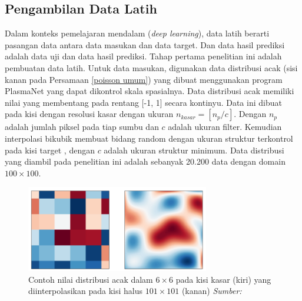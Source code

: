 \subsection{Pengambilan Data Latih}
\label{data_latih} Dalam konteks pemelajaran mendalam (\emph{deep learning}),
data latih berarti pasangan data antara data masukan dan data target. Dan data hasil
prediksi adalah data uji dan data hasil prediksi. Tahap pertama penelitian ini
adalah pembuatan data latih. Untuk data masukan, digunakan data distribusi acak
(sisi kanan pada Persamaan \eqref{poisson umum}) yang dibuat menggunakan program
PlasmaNet yang dapat dikontrol skala spasialnya. Data distribusi acak memiliki
nilai yang membentang pada rentang [-1, 1] secara kontinyu. Data ini dibuat pada
kisi dengan resolusi kasar dengan ukuran $n_{kasar}= [n_{p}/c]$. Dengan $n_{p}$
adalah jumlah piksel pada tiap sumbu dan $c$ adalah ukuran filter. Kemudian interpolasi
bikubik membuat bidang random dengan ukuran struktur terkontrol pada kisi target
\citep{cheng_illarramendi_bauerheim_cuenot_2021}, dengan $c$ adalah ukuran struktur
minimum. Data distribusi yang diambil pada penelitian ini adalah sebanyak 20.200
data dengan domain $100 \times 100$.

\begin{figure}[h!]
  \centering
  \includegraphics[width=8cm]{gambar/random.png}
  \caption{Contoh nilai distribusi acak dalam $6 \times 6$ pada kisi kasar (kiri)
  yang diinterpolasikan pada kisi halus $101 \times 101$ (kanan) \emph{Sumber: \citep{cheng_illarramendi_bauerheim_cuenot_2021}}}
\end{figure}

